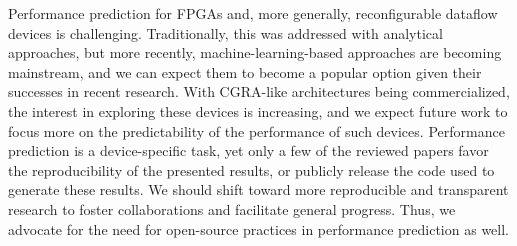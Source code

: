 Performance prediction for FPGAs and, more generally, reconfigurable dataflow devices is challenging. Traditionally, this was addressed with %
analytical approaches, but more recently, machine-learning-based approaches are becoming mainstream, and we can expect them to become a popular option given their successes in recent research. With CGRA-like architectures being commercialized, the interest in exploring these devices is increasing, and we %
expect future work to focus more on the predictability of the 
performance of such devices. Performance prediction is a device-specific task, yet only a %
few 
of the reviewed papers favor the reproducibility of the presented results, or publicly release the %
code used to generate these results. 
We should shift toward more reproducible and transparent research to foster %
collaborations and facilitate general progress. Thus, we advocate for the need for open-source practices %
in performance prediction as well.
